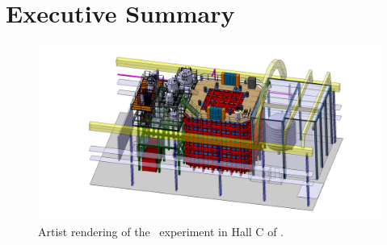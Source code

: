 \section{Executive Summary}
\label{sec:ExecutiveSummary}


\vspace{1cm}

\begin{figure}[t!]
\includegraphics[width=1.45\textwidth, angle=270]{./Figures/assembly_sequence_11_07/58.png}
\caption[Artist rendering of the \DSks\ experiment in Hall C of \LNGS]{Artist rendering of the \DSks\ experiment in Hall C of \LNGS.}
\label{fig:Overall-Design}
\end{figure}

